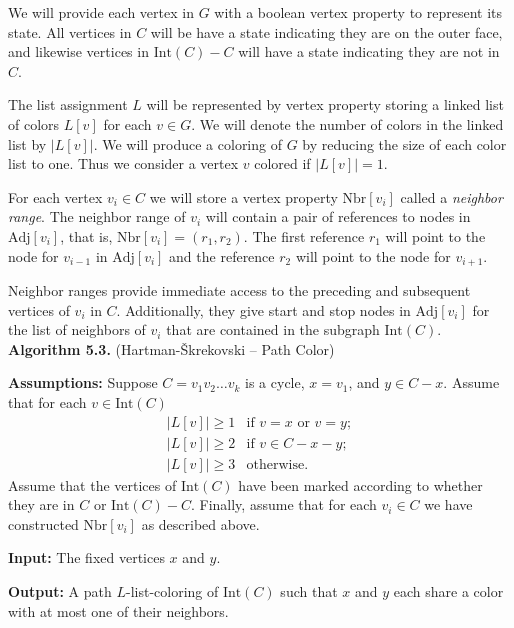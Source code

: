 \documentclass[letterpaper, 12pt]{article}
\theoremstyle{thm}
\begin{document}
We will provide each vertex in $G$ with a boolean vertex property to represent
its state. All vertices in $C$ will be have a state indicating they are on the
outer face, and likewise vertices in $\text{Int}(C)-C$ will have a state
indicating they are not in $C$.

The list assignment $L$ will be represented by vertex property storing a linked
list of colors $L[v]$ for each $v\in G$. We will denote the number of colors
in the linked list by $\big|L[v]\big|$. We will produce a coloring of $G$ by reducing
the size of each color list to one. Thus we consider a vertex $v$
colored if $\big|L[v]\big|=1$.

For each vertex $v_i\in C$ we will store a vertex property $\text{Nbr}[v_i]$
called a \textit{neighbor range}. The neighbor range of $v_i$ will contain a pair of
references to nodes in $\text{Adj}[v_i]$, that is, $\text{Nbr}[v_i]=(r_1,r_2)$.
The first reference $r_1$ will point to the
node for $v_{i-1}$ in $\text{Adj}[v_i]$ and the reference $r_2$ will point to
the node for $v_{i+1}$.

Neighbor ranges provide immediate access to the preceding and subsequent
vertices of $v_i$ in $C$. Additionally, they give start and stop nodes in
$\text{Adj}[v_i]$ for the list of neighbors of $v_i$ that are contained in the
subgraph $\text{Int}(C)$.\\

\noindent\textbf{Algorithm 5.3.} (Hartman-\v{S}krekovski -- Path Color)

\noindent\textbf{Assumptions:} Suppose $C=v_1v_2\ldots v_k$ is a cycle, $x=v_1$,
and $y\in C-x$. Assume that for each $v\in \text{Int}(C)$
\[
    \begin{array}{ll}
	    \big|L[v]\big|\ge 1 & \text{if } v=x \text{ or } v=y;\\
	    \big|L[v]\big|\ge 2 & \text{if } v\in C-x-y;\\
	    \big|L[v]\big|\ge 3 & \text{otherwise.}
    \end{array}
\]
Assume that the vertices of
$\text{Int}(C)$ have been marked according to whether they are in $C$ or
$\text{Int}(C)-C$. Finally, assume that for each $v_i\in C$ we have constructed
$\text{Nbr}[v_i]$ as described above.

\noindent\textbf{Input:} The fixed vertices $x$ and $y$.

\noindent\textbf{Output:} A path $L$-list-coloring of $\text{Int}(C)$ such that
$x$ and $y$ each share a color with at most one of their neighbors.
\end{document}
